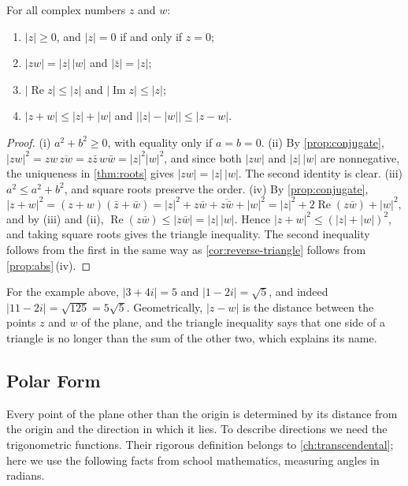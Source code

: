 \begin{proposition}
\label{prop:modulus}
For all complex numbers $z$ and $w$:
\begin{enumerate}
\item $|z|\ge0$, and $|z|=0$ if and only if $z=0$;
\item $|zw|=|z|\,|w|$ and $|\bar z|=|z|$;
\item $|\operatorname{Re}z|\le|z|$ and $|\operatorname{Im}z|\le|z|$;
\item $|z+w|\le|z|+|w|$ and $\bigl||z|-|w|\bigr|\le|z-w|$.
\end{enumerate}
\end{proposition}

\begin{proof}
(i) $a^2+b^2\ge0$, with equality only if $a=b=0$. (ii) By \cref{prop:conjugate}, $|zw|^2=zw\,\overline{zw}=z\bar z\,w\bar w=|z|^2|w|^2$, and since both $|zw|$ and $|z|\,|w|$ are nonnegative, the uniqueness in \cref{thm:roots} gives $|zw|=|z|\,|w|$. The second identity is clear. (iii) $a^2\le a^2+b^2$, and square roots preserve the order. (iv) By \cref{prop:conjugate},
\[
|z+w|^2=(z+w)(\bar z+\bar w)=|z|^2+z\bar w+\overline{z\bar w}+|w|^2=|z|^2+2\operatorname{Re}(z\bar w)+|w|^2 ,
\]
and by (iii) and (ii), $\operatorname{Re}(z\bar w)\le|z\bar w|=|z|\,|w|$. Hence $|z+w|^2\le(|z|+|w|)^2$, and taking square roots gives the triangle inequality. The second inequality follows from the first in the same way as \cref{cor:reverse-triangle} follows from \cref{prop:abs}\,(iv).
\end{proof}

For the example above, $|3+4i|=5$ and $|1-2i|=\sqrt5$, and indeed $|11-2i|=\sqrt{125}=5\sqrt5$. Geometrically, $|z-w|$ is the distance between the points $z$ and $w$ of the plane, and the triangle inequality says that one side of a triangle is no longer than the sum of the other two, which explains its name.

\subsection{Polar Form}

Every point of the plane other than the origin is determined by its distance from the origin and the direction in which it lies. To describe directions we need the trigonometric functions. Their rigorous definition belongs to \cref{ch:transcendental}; here we use the following facts from school mathematics, measuring angles in radians.

